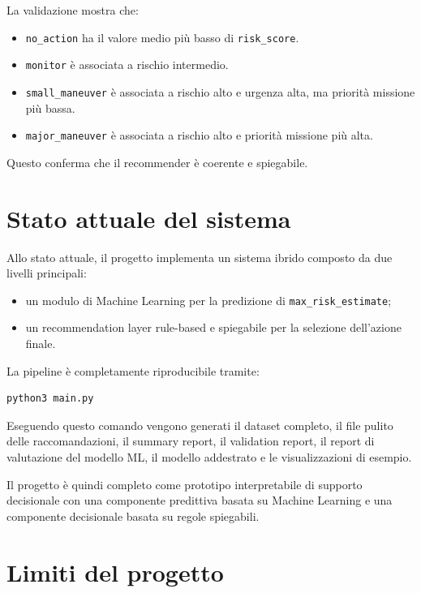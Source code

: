 \documentclass[12pt,a4paper]{article}
\begin{document}
La validazione mostra che:

\begin{itemize}
    \item \texttt{no\_action} ha il valore medio più basso di \texttt{risk\_score}.
    \item \texttt{monitor} è associata a rischio intermedio.
    \item \texttt{small\_maneuver} è associata a rischio alto e urgenza alta, ma priorità missione più bassa.
    \item \texttt{major\_maneuver} è associata a rischio alto e priorità missione più alta.
\end{itemize}

Questo conferma che il recommender è coerente e spiegabile.

\section{Stato attuale del sistema}

Allo stato attuale, il progetto implementa un sistema ibrido composto da due livelli principali:

\begin{itemize}
    \item un modulo di Machine Learning per la predizione di \texttt{max\_risk\_estimate};
    \item un recommendation layer rule-based e spiegabile per la selezione dell'azione finale.
\end{itemize}

La pipeline è completamente riproducibile tramite:

\begin{verbatim}
python3 main.py
\end{verbatim}

Eseguendo questo comando vengono generati il dataset completo, il file pulito delle raccomandazioni, il summary report, il validation report, il report di valutazione del modello ML, il modello addestrato e le visualizzazioni di esempio.

Il progetto è quindi completo come prototipo interpretabile di supporto decisionale con una componente predittiva basata su Machine Learning e una componente decisionale basata su regole spiegabili.

\section{Limiti del progetto}
\end{document}
